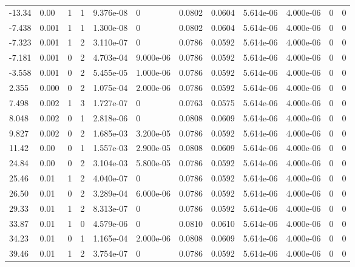 \documentclass[preview]{standalone}
\begin{document}
{{\begin{tabular}{L{1.2cm}C{1.2cm} C{0.3cm}C{0.5cm} C{1.4cm}C{1.4cm} C{1.4cm}C{1.4cm} C{1.6cm}C{1.6cm} C{1.6cm}C{1.6cm}}
  -13.34  &  0.00  & 1     &  1 &  9.376e-08  & 0  &  0.0802&   0.0604& 5.614e-06 & 4.000e-06   &  0 & 0  \\ 
  -7.438  &  0.001  & 1     &  1 &  1.300e-08  & 0  &  0.0802&   0.0604& 5.614e-06 & 4.000e-06   &  0 & 0  \\ 
  -7.323  &  0.001  & 1     &  2 &  3.110e-07  & 0  &  0.0786&   0.0592& 5.614e-06 & 4.000e-06   &  0 & 0  \\ 
  -7.181  &  0.001  & 0     &  2 &  4.703e-04  & 9.000e-06  &  0.0786&   0.0592& 5.614e-06 & 4.000e-06   &  0 & 0  \\ 
  -3.558  &  0.001  & 0     &  2 &  5.455e-05  & 1.000e-06  &  0.0786&   0.0592& 5.614e-06 & 4.000e-06   &  0 & 0  \\ 
  2.355  &  0.000  & 0     &  2 &  1.075e-04  & 2.000e-06  &  0.0786&   0.0592& 5.614e-06 & 4.000e-06   &  0 & 0  \\ 
  7.498  &  0.002  & 1     &  3 &  1.727e-07  & 0  &  0.0763&   0.0575& 5.614e-06 & 4.000e-06   &  0 & 0  \\ 
  8.048  &  0.002  & 0     &  1 &  2.818e-06  & 0  &  0.0808&   0.0609& 5.614e-06 & 4.000e-06   &  0 & 0  \\ 
  9.827  &  0.002  & 0     &  2 &  1.685e-03  & 3.200e-05  &  0.0786&   0.0592& 5.614e-06 & 4.000e-06   &  0 & 0  \\ 
  11.42  &  0.00  & 0     &  1 &  1.557e-03  & 2.900e-05  &  0.0808&   0.0609& 5.614e-06 & 4.000e-06   &  0 & 0  \\ 
  24.84  &  0.00  & 0     &  2 &  3.104e-03  & 5.800e-05  &  0.0786&   0.0592& 5.614e-06 & 4.000e-06   &  0 & 0  \\ 
  25.46  &  0.01  & 1     &  2 &  4.040e-07  & 0  &  0.0786&   0.0592& 5.614e-06 & 4.000e-06   &  0 & 0  \\ 
  26.50  &  0.01  & 0     &  2 &  3.289e-04  & 6.000e-06  &  0.0786&   0.0592& 5.614e-06 & 4.000e-06   &  0 & 0  \\ 
  29.33  &  0.01  & 1     &  2 &  8.313e-07  & 0  &  0.0786&   0.0592& 5.614e-06 & 4.000e-06   &  0 & 0  \\ 
  33.87  &  0.01  & 1     &  0 &  4.579e-06  & 0  &  0.0810&   0.0610& 5.614e-06 & 4.000e-06   &  0 & 0  \\ 
  34.23  &  0.01  & 0     &  1 &  1.165e-04  & 2.000e-06  &  0.0808&   0.0609& 5.614e-06 & 4.000e-06   &  0 & 0  \\ 
  39.46  &  0.01  & 1     &  2 &  3.754e-07  & 0  &  0.0786&   0.0592& 5.614e-06 & 4.000e-06   &  0 & 0  \\ 

\end{tabular}}}
\end{document}
